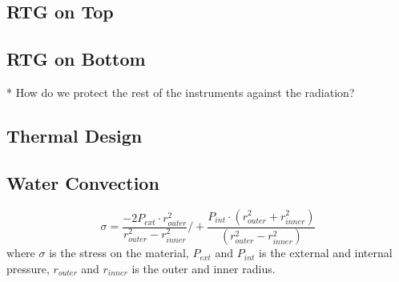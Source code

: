 \subsection{RTG on Top}

\subsection{RTG on Bottom}

* How do we protect the rest of the instruments against the radiation?


\subsection{Thermal Design}

\subsection{Water Convection}

\begin{equation}\label{eq:pressure}
\sigma = \frac{-2 P_{ext}\cdot r_{outer}^2}{r_{outer}^2-r_{inner}^2}/ + \frac{P_{int}\cdot (r_{outer}^2+r_{inner}^2)}{(r_{outer}^2-r_{inner}^2)}
\end{equation}
where $\sigma$ is the stress on the material, $P_{ext}$ and $P_{int}$ is the external and internal pressure, $r_{outer}$ and $r_{inner}$ is the outer and inner radius. 


